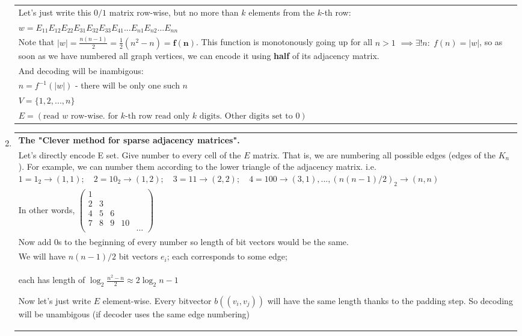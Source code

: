 \begin{enumerate}
\begin{tabular}{|p{15cm}}
	Let's just write this $0/1$ matrix row-wise, but no more than $k$ elements from the $k$-th row:\\
	\quad \(w = E_{11} E_{12} E_{22} E_{31} E_{32} E_{33} E_{41}... E_{n1} E_{n2} ... E_{nn}\) \\
	Note that \(|w| = \frac{n(n-1)}{2} = \frac{1}{2} (n^2-n) = \mathbf{f(n)}\). 
	This function is monotonously going up for all $n>1$ \(\implies \exists ! n:\; f(n)=|w| \),
	so as soon as we have numbered all graph vertices, we can encode it using \textbf{half} of its adjacency matrix. \\
	And decoding will be inambigous: \\
	\quad \(n = f^{-1}(|w|) \) - there will be only one such $n$ \\
	\quad \(V = \{1, 2, ..., n\}\) \\
	\quad \(E = (\text{read $w$ row-wise. for $k$-th row read only $k$ digits. Other digits set to $0$})\)
	\end{tabular}
	
	\item
	\begin{tabular}{|p{15cm}}
		\textbf{The "Clever method for sparse adjacency matrices".}\\
	Let's directly encode E set. Give number to every cell of the $E$ matrix. 
	That is, we are numbering all possible edges (edges of the $K_n$). 
	For example, we can number them according to the lower triangle of the adjacency matrix.
	i.e. $1 = 1_2 \to (1,1);\quad 2 = 10_2 \to (1,2);\quad 3 = 11 \to (2,2);\quad4 = 100 \to (3,1), ..., (n(n-1)/2)_2 \to (n,n)$\\ 
	In other words, $\begin{pmatrix}
		1 & & & & \\ 2 & 3 & & \\ 4 & 5 & 6 & & \\ 7 & 8 & 9 & 10 \\& & & & ...
	\end{pmatrix}$\\
	Now add 0s to the beginning of every number so length of bit vectors would be the same.\\
	We will have $n(n-1)/2$ bit vectors $e_i$; each corresponds to some edge; \\each has length of  
	$\log_2 \frac{n^2 - n}{2} \approx 2 \log_2 n - 1$

	Now let's just write $E$ element-wise. Every bitvector $b((v_i, v_j))$ will have the same length thanks to the padding step.
	So  decoding will be unambigous (if decoder uses the same edge numbering)
	\end{tabular}
\end{enumerate}